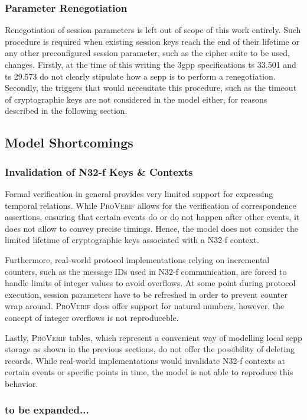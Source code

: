 \subsubsection{Parameter Renegotiation}

Renegotiation of session parameters is left out of scope of this work entirely.
Such procedure is required when existing session keys reach the end of their lifetime or any other preconfigured session parameter, such as the cipher suite to be used, changes.
Firstly, at the time of this writing the \gls{3gpp} specifications \gls{ts} 33.501 and \gls{ts} 29.573 do not clearly stipulate how a \gls{sepp} is to perform a renegotiation.
Secondly, the triggers that would necessitate this procedure, such as the timeout of cryptographic keys are not considered in the model either, for reasons described in the following section.

\subsection{Model Shortcomings}

\subsubsection{Invalidation of N32-f Keys \& Contexts}

Formal verification in general provides very limited support for expressing temporal relations.
While \textsc{ProVerif} allows for the verification of correspondence assertions, ensuring that certain events do or do not happen after other events, it does not allow to convey precise timings.
Hence, the model does not consider the limited lifetime of cryptographic keys associated with a N32-f context.

Furthermore, real-world protocol implementations relying on incremental counters, such as the message IDs used in N32-f communication, are forced to handle limits of integer values to avoid overflows.
At some point during protocol execution, session parameters have to be refreshed in order to prevent counter wrap around.
\textsc{ProVerif} does offer support for natural numbers, however, the concept of integer overflows is not reproduceble.

Lastly, \textsc{ProVerif} tables, which represent a convenient way of modelling local \gls{sepp} storage as shown in the previous sections, do not offer the possibility of deleting records.
While real-world implementations would invalidate N32-f contexts at certain events or specific points in time, the model is not able to reproduce this behavior.

\subsubsection{to be expanded...}